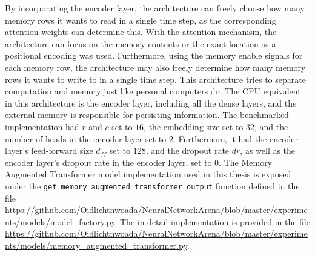 \documentclass[draft,final]{vutinfth} %
\begin{document}
By incorporating the encoder layer, the architecture can freely choose how many memory rows it wants to read in a single time step, as the corresponding attention weights can determine this.
With the attention mechanism, the architecture can focus on the memory contents or the exact location as a positional encoding was used.
Furthermore, using the memory enable signals for each memory row, the architecture may also freely determine how many memory rows it wants to write to in a single time step.
This architecture tries to separate computation and memory just like personal computers do.
The CPU equivalent in this architecture is the encoder layer, including all the dense layers, and the external memory is responsible for persisting information.
The benchmarked implementation had $r$ and $c$ set to $16$, the embedding size set to $32$, and the number of heads in the encoder layer set to $2$. Furthermore, it had the encoder layer's feed-forward size $d_{ff}$ set to $128$, and the dropout rate $dr$, as well as the encoder layer's dropout rate in the encoder layer, set to $0$.
The Memory Augmented Transformer model implementation used in this thesis is exposed under the \texttt{get\_memory\_augmented\_transformer\_output} function defined in the file \url{https://github.com/Oidlichtnwoada/NeuralNetworkArena/blob/master/experiments/models/model_factory.py}.
The in-detail implementation is provided in the file \url{https://github.com/Oidlichtnwoada/NeuralNetworkArena/blob/master/experiments/models/memory_augmented_transformer.py}.
\end{document}
